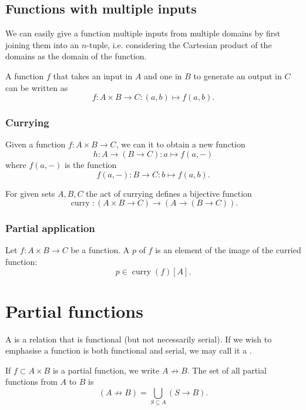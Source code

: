 \subsection{Functions with multiple inputs}
We can easily give a function multiple inputs from multiple domains by first joining them into an $n$-tuple, i.e. considering the Cartesian product of the domains as the domain of the function.

\begin{example}
A function $f$ that takes an input in $A$ and one in $B$ to generate an output in $C$ can be written as
\[ f: A\times B \to C: (a,b)\mapsto f(a,b). \]
\end{example}
\subsubsection{Currying}
\begin{definition}
Given a function $f: A\times B \to C$, we can  it to obtain a new function
\[ h: A \to (B\to C): a\mapsto f(a,-) \]
where $f(a,-)$ is the function
\[ f(a,-): B \to C: b\mapsto f(a,b). \]
\end{definition}
\begin{lemma}
For given sets $A,B,C$ the act of currying defines a bijective function
\[ \operatorname{curry}: (A\times B \to C) \to (A \to (B\to C)). \]
\end{lemma}

\subsubsection{Partial application}
\begin{definition}
Let $f: A\times B \to C$ be a function. A  $p$ of $f$ is an element of the image of the curried function:
\[ p\in \operatorname{curry}(f)[A]. \]
\end{definition}

\section{Partial functions}
\begin{definition}
A  is a relation that is functional (but not necessarily serial). If we wish to emphasise a function is both functional and serial, we may call it a .
\end{definition}
If $f\subset A\times B$ is a partial function, we write $A\not \to B$. The set of all partial functions from $A$ to $B$ is
\[ (A\not \to B) = \bigcup _{S\subseteq A}(S\to B). \]

